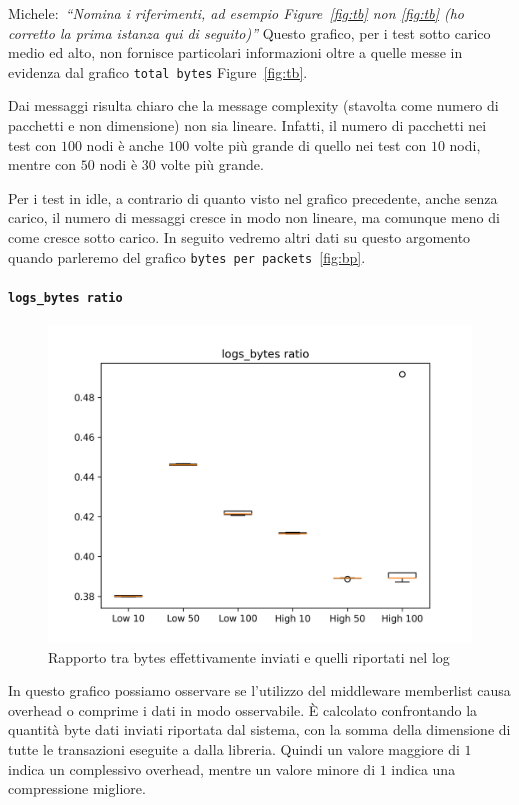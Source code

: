 \documentclass[12pt, a4paper]{article}
\newcommand{\michele}[1]{{\color{red}Michele:~}{\itshape``{#1}''}}
\begin{document}
\michele{Nomina i riferimenti, ad esempio Figure~\ref{fig:tb} non \ref{fig:tb} (ho corretto la prima istanza qui di seguito)}
Questo grafico, per i test sotto carico medio ed alto, non fornisce particolari informazioni oltre a quelle messe in evidenza dal grafico \lstinline{total bytes} Figure~\ref{fig:tb}.

Dai messaggi risulta chiaro che la message complexity (stavolta come numero di pacchetti e non dimensione) non sia lineare. Infatti, il numero di pacchetti nei test con $100$ nodi è anche $100$ volte più grande di quello nei test con $10$ nodi, mentre con $50$ nodi è $30$ volte più grande.

Per i test in idle, a contrario di quanto visto nel grafico precedente, anche senza carico, il numero di messaggi cresce in modo non lineare, ma comunque meno di come cresce sotto carico. In seguito vedremo altri dati su questo argomento quando parleremo del grafico \lstinline{bytes per packets}~\ref{fig:bp}.

\paragraph{\lstinline{logs_bytes ratio}}

\begin{figure}[H]
    \includegraphics[width=\linewidth, keepaspectratio]{graphs/logs_bytes ratio.png}
    \caption{Rapporto tra bytes effettivamente inviati e quelli riportati nel log}
    \label{fig:lbr}
\end{figure}

In questo grafico possiamo osservare se l'utilizzo del middleware memberlist causa overhead o comprime i dati in modo osservabile.
È calcolato confrontando la quantità byte dati inviati riportata dal sistema, con la somma della dimensione di tutte le transazioni eseguite a dalla libreria. Quindi un valore maggiore di $1$ indica un complessivo overhead, mentre un valore minore di $1$ indica una compressione migliore.
\end{document}
